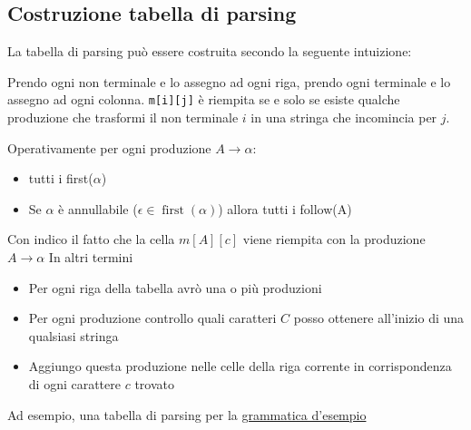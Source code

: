 \subsection{Costruzione tabella di parsing}\label{parsing table}
La tabella di parsing può essere costruita secondo la seguente intuizione:
\begin{center}
	Prendo ogni non terminale e lo assegno ad ogni riga, prendo ogni terminale e lo assegno ad ogni colonna. \verb|m[i][j]| è riempita se e solo se esiste qualche produzione che trasformi il non terminale $ i $ in una stringa che incomincia per $ j $.
\end{center}
Operativamente per ogni produzione $ A \rightarrow \alpha  $:
\begin{itemize}
	\item {} tutti i first($ \alpha $)
	\item Se $ \alpha  $ è annullabile ($ \epsilon \in \operatorname{first}\left(\alpha \right)  $) allora  tutti i follow(A)
\end{itemize}
Con  indico il fatto che la cella $ m\left[A\right]\left[c\right] $ viene riempita con la produzione $ A \rightarrow \alpha $
\vskip3mm
In altri termini
\begin{itemize}
	\item Per ogni riga della tabella avrò una o più produzioni
	\item Per ogni produzione controllo quali caratteri $ C $ posso ottenere all'inizio di una qualsiasi stringa
	\item Aggiungo questa produzione nelle celle della riga corrente in corrispondenza di ogni carattere $ c $ trovato
\end{itemize}
Ad esempio, una tabella di parsing per la \hyperref[grammatica esempio]{grammatica d'esempio}

